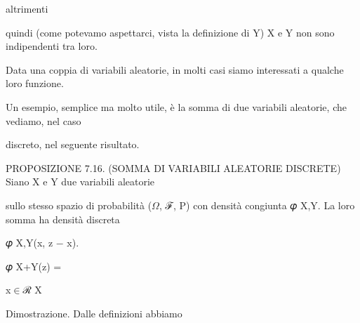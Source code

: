 \documentclass[a4paper,portrait,12pt]{article}
\begin{document}
\begin{flushleft}
altrimenti
\end{flushleft}





\begin{flushleft}
quindi (come potevamo aspettarci, vista la definizione di Y) X e Y non sono indipendenti tra loro.
\end{flushleft}


\begin{flushleft}
Data una coppia di variabili aleatorie, in molti casi siamo interessati a qualche loro funzione.
\end{flushleft}


\begin{flushleft}
Un esempio, semplice ma molto utile, \`{e} la somma di due variabili aleatorie, che vediamo, nel caso
\end{flushleft}


\begin{flushleft}
discreto, nel seguente risultato.
\end{flushleft}


\begin{flushleft}
PROPOSIZIONE 7.16. (SOMMA DI VARIABILI ALEATORIE DISCRETE) Siano X e Y due variabili aleatorie
\end{flushleft}


\begin{flushleft}
sullo stesso spazio di probabilit\`{a} ($\Omega$, ℱ, P) con densit\`{a} congiunta 𝜑 X,Y. La loro somma ha densit\`{a} discreta
\end{flushleft}


\begin{flushleft}
𝜑 X,Y(x, z $-$ x).
\end{flushleft}





\begin{flushleft}
𝜑 X+Y(z) =
\end{flushleft}


\begin{flushleft}
x$\in$ℛ X
\end{flushleft}





\begin{flushleft}
Dimostrazione. Dalle definizioni abbiamo
\end{flushleft}
\end{document}
